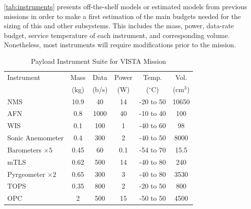 \begin{minipage}[t]{0.42\textwidth}
\small
\autoref{tab:instruments} presents off-the-shelf models or estimated models from previous missions in order to make a first estimation of the main budgets needed for the sizing of this and other subsystems. This includes the mass, power, data-rate budget, service temperature of each instrument, and corresponding volume. Nonetheless, most instruments will require modifications prior to the mission.
\end{minipage}
\hfill
\begin{minipage}[t]{0.54\textwidth}

\begin{table}[H]
\centering
\small
\setlength{\tabcolsep}{3pt}
\renewcommand{\arraystretch}{0.9}

\caption{Payload Instrument Suite for VISTA Mission}
\label{tab:venus_payload}

\begin{tabular}{lccccc}
\toprule
Instrument & 
Mass & 
Data & 
Power & 
Temp. & 
Vol. \\
& (kg) & (b/s) & (W) & ($^\circ$C) & (cm$^3$) \\
\midrule
NMS \cite{NMS} &
10.9 & 40\cite{hoffman1979pioneer} & 14 & -20 to 50 & 10650 \\
AFN \cite{instruments} &
0.8 & 1000\cite{baumgardner2022deducing} & 40 & -10 to 40 & 100 \\
WIS \cite{instruments} &
0.1 & 100 & 1 & -40 to 60 & 98 \\
Sonic Anemometer \cite{Cheng2024StratosphericSonicAnemometer} &
0.4 & 300 & 2 & -40 to 50 & 8000 \\
Barometers $\times5$ \cite{barometers} &
0.45 & 60 & 0.1 & -54 to 70 & 15.5 \\
mTLS \cite{instruments} &
0.62 & 500 & 14 & -40 to 80 & 240 \\
Pyrgeometer $\times2$ \cite{pyro_radiometer} &
0.65 & 300 & 3 & -40 to 80 & 3530 \\
TOPS \cite{instruments} &
0.35 & 800 & 2 & -20 to 50 & 800 \\
OPC \cite{OPC} & 
2 & 500 & 15 & -50 to 50 & 4500 \\
\bottomrule
\end{tabular}

\label{tab:instruments}
\end{table}

\end{minipage}

